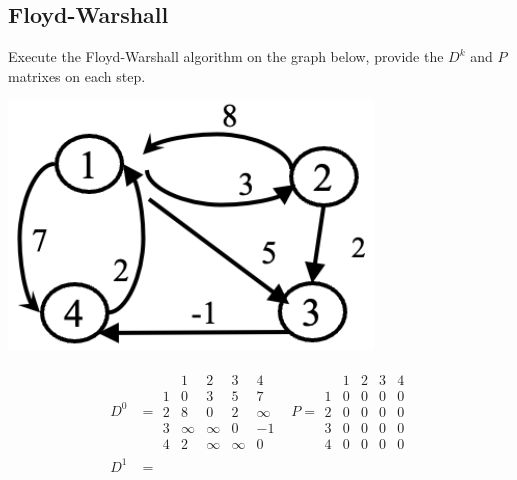 \documentclass{article}
\begin{document}
\begin{multicols*}{2}
\begin{multicols*}{2}
    \end{multicols*}
    \columnbreak
    \subsection*{Floyd-Warshall}
    Execute the Floyd-Warshall algorithm on the graph below, provide the \(D^k\)
    and \(P\) matrixes on each step.
    \begin{center}
        \includegraphics[width=0.75\columnwidth]{floyd.png}
    \end{center}
    \begin{align*}
        D^0 & = \begin{array}{c|cccc}
                      & 1      & 2      & 3      & 4      \\
                    \hline
                    1 & 0      & 3      & 5      & 7      \\
                    2 & 8      & 0      & 2      & \infty \\
                    3 & \infty & \infty & 0      & -1     \\
                    4 & 2      & \infty & \infty & 0
                \end{array}
            & P = \begin{array}{c|cccc}
                        & 1 & 2 & 3 & 4 \\
                      \hline
                      1 & 0 & 0 & 0 & 0 \\
                      2 & 0 & 0 & 0 & 0 \\
                      3 & 0 & 0 & 0 & 0 \\
                      4 & 0 & 0 & 0 & 0
                  \end{array}                \\
        D^1 & = \begin{array}{c|cccc}

\end{array}
\end{align*}
\end{multicols*}
\end{document}
